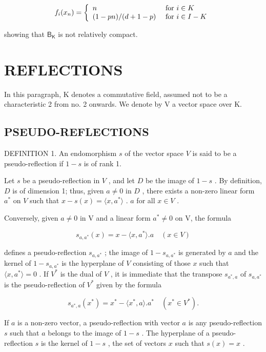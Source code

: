 \[
f _ {i} (x _ {n}) = \left\{ \begin{array}{l l} n & \text { for } i \in K \\ (1 - p n) / (d + 1 - p) & \text { for } i \in I - K \end{array} \right.
\]

showing that \(\mathsf{B}_{\mathsf{K}}\) is not relatively compact.

\section{REFLECTIONS}

In this paragraph, K denotes a commutative field, assumed not to be a characteristic 2 from no. 2 onwards. We denote by V a vector space over K.

\subsection{PSEUDO-REFLECTIONS}

DEFINITION 1. An endomorphism \(s\) of the vector space \(V\) is said to be a pseudo-reflection if \(1 - s\) is of rank 1.

Let \(s\) be a pseudo-reflection in \(V\) , and let \(D\) be the image of \(1 - s\) . By definition, \(D\) is of dimension 1; thus, given \(a \neq 0\) in \(D\) , there exists a non-zero linear form \(a^*\) on \(V\) such that \(x - s(x) = \langle x, a^* \rangle\) . \(a\) for all \(x \in V\) .

Conversely, given \(a \neq 0\) in V and a linear form \(a^{*} \neq 0\) on V, the formula

\[
s _ {a, a ^ {*}} (x) = x - \langle x, a ^ {*} \rangle . a \quad (x \in V)\tag{1}
\]

defines a pseudo-reflection \(s_{a,a^*}\) ; the image of \(1 - s_{a,a^*}\) is generated by \(a\) and the kernel of \(1 - s_{a,a^*}\) is the hyperplane of \(V\) consisting of those \(x\) such that \(\langle x, a^* \rangle = 0\) . If \(V^*\) is the dual of \(V\) , it is immediate that the transpose \(s_{a^*,a}\) of \(s_{a,a^*}\) is the pseudo-reflection of \(V^*\) given by the formula

\[
s _ {a ^ {*}, a} (x ^ {*}) = x ^ {*} - \langle x ^ {*}, a \rangle . a ^ {*} \quad (x ^ {*} \in V ^ {*}).\tag{2}
\]

If \(a\) is a non-zero vector, a pseudo-reflection with vector \(a\) is any pseudo-reflection \(s\) such that \(a\) belongs to the image of \(1 - s\) . The hyperplane of a pseudo-reflection \(s\) is the kernel of \(1 - s\) , the set of vectors \(x\) such that \(s(x) = x\) .

